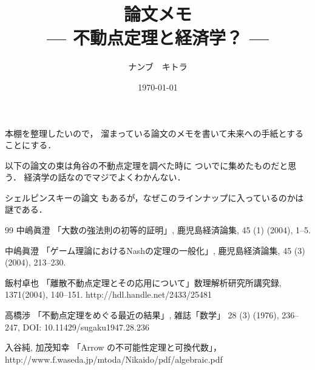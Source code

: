 \documentclass[leqno, a4paper, 12pt]{jsarticle}
\title{論文メモ
\large{\\--- 不動点定理と経済学？ ---}
}
\author{ナンブ　キトラ}
\date{\today}
\begin{document}
\maketitle

本棚を整理したいので，
溜まっている論文のメモを書いて未来への手紙とすることにする．


以下の論文の束は角谷の不動点定理を調べた時に
ついでに集めたものだと思う．
経済学の話なのでマジでよくわかんない．


シェルピンスキーの論文
\cite{Sierpinski1924}
もあるが，なぜこのラインナップに入っているのかは謎である．

\begin{thebibliography}{99}
中嶋眞澄
「大数の強法則の初等的証明」, 
鹿児島経済論集, 45 (1) (2004), 1--5. 

中嶋眞澄
「ゲーム理論におけるNashの定理の一般化」, 
鹿児島経済論集, 45 (3) (2004), 213--230. 

飯村卓也
「離散不動点定理とその応用について」数理解析研究所講究録, 
1371(2004),  140--151. 
http://hdl.handle.net/2433/25481

高橋渉
「不動点定理をめぐる最近の結果」, 
雑誌「数学」
28 (3) (1976), 
236--247, 
DOI: 10.11429/sugaku1947.28.236

入谷純, 加茂知幸
「Arrow の不可能性定理と可換代数」，
http://www.f.waseda.jp/mtoda/Nikaido/pdf/algebraic.pdf

\end{thebibliography}



\nocite{*}


\end{document}
